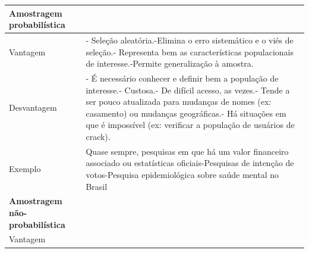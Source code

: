 \documentclass[
]{book}
\begin{document}
\begin{longtable}[]{@{}ll@{}}
\toprule
\begin{minipage}[b]{0.43\columnwidth}\raggedright
Amostragem probabilística\strut
\end{minipage} & \begin{minipage}[b]{0.51\columnwidth}\raggedright
\strut
\end{minipage}\tabularnewline
\midrule
\endhead
\begin{minipage}[t]{0.43\columnwidth}\raggedright
Vantagem\strut
\end{minipage} & \begin{minipage}[t]{0.51\columnwidth}\raggedright
- Seleção aleatória.-Elimina o erro sistemático e o viés de seleção.- Representa bem as características populacionais de interesse.-Permite generalização à amostra.\strut
\end{minipage}\tabularnewline
\begin{minipage}[t]{0.43\columnwidth}\raggedright
Desvantagem\strut
\end{minipage} & \begin{minipage}[t]{0.51\columnwidth}\raggedright
- É necessário conhecer e definir bem a população de interesse.- Custosa.- De difícil acesso, as vezes.- Tende a ser pouco atualizada para mudanças de nomes (ex: casamento) ou mudanças geográficas.- Há situações em que é impossível (ex: verificar a população de usuários de crack).\strut
\end{minipage}\tabularnewline
\begin{minipage}[t]{0.43\columnwidth}\raggedright
Exemplo\strut
\end{minipage} & \begin{minipage}[t]{0.51\columnwidth}\raggedright
Quase sempre, pesquisas em que há um valor financeiro associado ou estatísticas oficiais-Pesquisas de intenção de votos-Pesquisa epidemiológica sobre saúde mental no Brasil\strut
\end{minipage}\tabularnewline
\begin{minipage}[t]{0.43\columnwidth}\raggedright
\textbf{Amostragem não-probabilística}\strut
\end{minipage} & \begin{minipage}[t]{0.51\columnwidth}\raggedright
\strut
\end{minipage}\tabularnewline
\begin{minipage}[t]{0.43\columnwidth}\raggedright
Vantagem\strut
\end{minipage} & \begin{minipage}[t]{0.51\columnwidth}\raggedright

\end{minipage}
\end{longtable}
\end{document}
